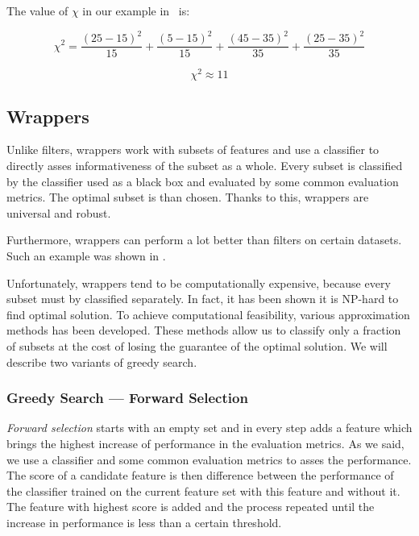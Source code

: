 The value of $\chi$ in our example in 
~is:

\begin{equation}
\chi^2 = 
\frac{\left(25-15\right)^2}{15} +
\frac{\left(5-15\right)^2}{15} +
\frac{\left(45-35\right)^2}{35} +
\frac{\left(25-35\right)^2}{35}
\end{equation}

\begin{equation}
\chi^2 \approx 11
\end{equation}


\subsection{Wrappers}

Unlike filters, wrappers work with subsets of features
and use a classifier to directly asses informativeness of the subset as a whole.
Every subset is classified by the classifier used as a black box
and evaluated by some common evaluation metrics.
The optimal subset is than chosen.
Thanks to this, wrappers are universal and robust.

Furthermore, wrappers can perform a lot better than filters on certain datasets.
Such an example was shown in .

Unfortunately, wrappers tend to be computationally expensive,
because every subset must by classified separately.
In fact, it has been shown it is NP-hard to find optimal solution.
To achieve computational feasibility, various approximation methods has been developed.
These methods allow us to classify only a fraction of subsets
at the cost of losing the guarantee of the optimal solution.
We will describe two variants of greedy search.


\subsubsection{Greedy Search --- Forward Selection}

{\it Forward selection} starts with an empty set and in every step adds a feature which brings the highest increase of performance in the evaluation metrics.
As we said, we use a classifier and some common evaluation metrics to asses the performance.
The score of a candidate feature is then difference between the performance of the classifier trained on the current feature set with this feature and without it.
The feature with highest score is added and the process repeated until the increase in performance is less than a certain threshold. 

